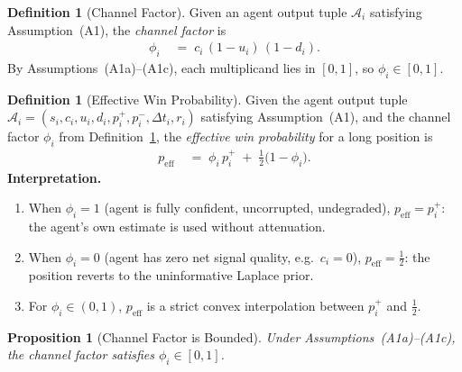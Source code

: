 \documentclass[12pt,openany]{book}
\newcommand{\calA}{\mathcal{A}}
\numberwithin{equation}{chapter}
\theoremstyle{plain}
\newtheorem{proposition}[theorem]{Proposition}
\theoremstyle{definition}
\newtheorem{definition}[theorem]{Definition}
\theoremstyle{remark}
\numberwithin{equation}{chapter}
\theoremstyle{plain}
\begin{document}
\begin{definition}[Channel Factor]
\label{def:channel-factor}
Given an agent output tuple $\calA_i$ satisfying
Assumption~\textup{(A1)}, the \emph{channel factor} is
\begin{align}
  \phi_i
  &\;=\; c_i\,(1 - u_i)\,(1 - d_i).
  \label{eq:channel-factor}
\end{align}
By Assumptions~\textup{(A1a)}--\textup{(A1c)}, each multiplicand
lies in $[0,1]$, so $\phi_i \in [0,1]$.
\end{definition}

\begin{definition}[Effective Win Probability]
\label{def:effective-win-prob}
Given the agent output tuple $\calA_i = (s_i, c_i, u_i, d_i,
p_i^+, p_i^-, \Delta t_i, r_i)$ satisfying
Assumption~\textup{(A1)}, and the channel factor $\phi_i$ from
Definition~\ref{def:channel-factor}, the \emph{effective win
probability} for a long position is
\begin{align}
  p_{\mathrm{eff}}
  &\;=\; \phi_i\, p_i^+
         \;+\; \tfrac{1}{2}\bigl(1 - \phi_i\bigr).
  \label{eq:effective-win-prob}
\end{align}
\textbf{Interpretation.}
\begin{enumerate}
  \item[\textup{(i)}] When $\phi_i = 1$ (agent is fully
        confident, uncorrupted, undegraded),
        $p_{\mathrm{eff}} = p_i^+$: the agent's own estimate
        is used without attenuation.
  \item[\textup{(ii)}] When $\phi_i = 0$ (agent has zero net
        signal quality, e.g.\ $c_i = 0$),
        $p_{\mathrm{eff}} = \tfrac{1}{2}$: the position reverts
        to the uninformative Laplace prior.
  \item[\textup{(iii)}] For $\phi_i \in (0,1)$,
        $p_{\mathrm{eff}}$ is a strict convex interpolation
        between $p_i^+$ and $\tfrac{1}{2}$.
\end{enumerate}
\end{definition}

\begin{proposition}[Channel Factor is Bounded]
\label{prop:channel-bounded-local}
Under Assumptions~\textup{(A1a)}--\textup{(A1c)},
the channel factor satisfies $\phi_i \in [0,1]$.
\end{proposition}
\end{document}
